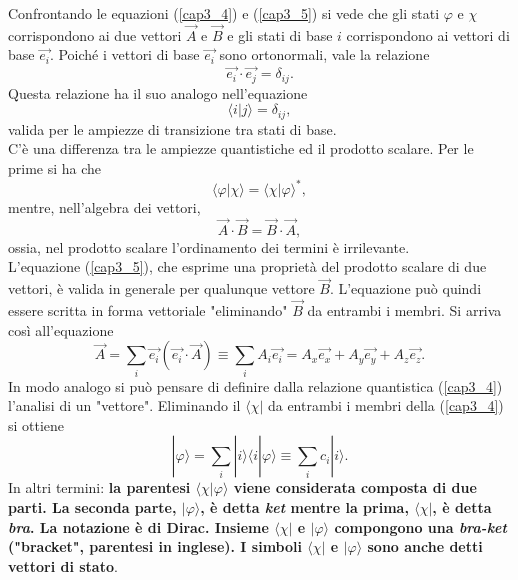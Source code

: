 \documentclass[a4paper,12pt,oneside]{book}
\begin{document}
Confrontando le equazioni (\ref{cap3_4}) e (\ref{cap3_5}) si vede che gli stati $\varphi$ e $\chi$ corrispondono ai due vettori $\vec{A}$ e $\vec{B}$ e gli stati di base $i$ corrispondono ai vettori di base $\vec{e_i}$. Poiché i vettori di base $\vec{e_i}$ sono ortonormali, vale la relazione
	\begin{equation}
		\vec{e_i} \cdot \vec{e_j}= \delta_{ij} .
	\end{equation}
Questa relazione ha il suo analogo nell'equazione
	\begin{equation}
		\langle i | j \rangle = \delta_{ij} ,
	\end{equation}
valida per le ampiezze di transizione tra stati di base.\\
C'è una differenza tra le ampiezze quantistiche ed il prodotto scalare. Per le prime si ha che
	\begin{equation}
		\langle \varphi | \chi \rangle = \langle \chi | \varphi\rangle ^* ,
	\label{cap3_6}
	\end{equation} 
mentre, nell'algebra dei vettori, 
	\begin{equation}
		\vec{A} \cdot \vec{B}= \vec{B} \cdot \vec{A} ,
	\label{cap3_7}
	\end{equation}
ossia, nel prodotto scalare l'ordinamento dei termini è irrilevante.\\

L'equazione (\ref{cap3_5}), che esprime una proprietà del prodotto scalare di due vettori, è valida in generale per qualunque vettore $\vec{B}$. L'equazione può quindi essere scritta in forma vettoriale "eliminando" $\vec{B}$ da entrambi i membri. Si arriva così all'equazione 
	\begin{equation}
		\vec{A} = \sum \limits_{i} \vec{e_i} (\vec{e_i}\cdot\vec{A}) \equiv \sum \limits_{i} A_i\vec{e_i}= A_x\vec{e_x}+A_y\vec{e_y}+A_z\vec{e_z} .
	\end{equation}
In modo analogo si può pensare di definire dalla relazione quantistica (\ref{cap3_4}) l'analisi di un "vettore". Eliminando il $\langle \chi |$ da entrambi i membri della (\ref{cap3_4}) si ottiene
	\begin{equation}
		\boxed{\boxed{
 			| \varphi \rangle= \sum \limits_{i} | i \rangle \langle i | \varphi \rangle \equiv \sum \limits_{i} c_i | i \rangle .
 			}}
	\label{cap3_8}
	\end{equation}
In altri termini: \textbf{la parentesi $\langle \chi | \varphi \rangle $ viene considerata composta di due parti. La seconda parte, $| \varphi \rangle $, è detta \emph{ket} mentre la prima, $\langle \chi |$, è detta \emph{bra}. La notazione è di Dirac. Insieme $\langle \chi |$ e $| \varphi \rangle$ compongono una \emph{bra-ket} ("bracket", parentesi in inglese). I simboli $\langle \chi |$ e $| \varphi \rangle$ sono anche detti vettori di stato}.\\
\end{document}
